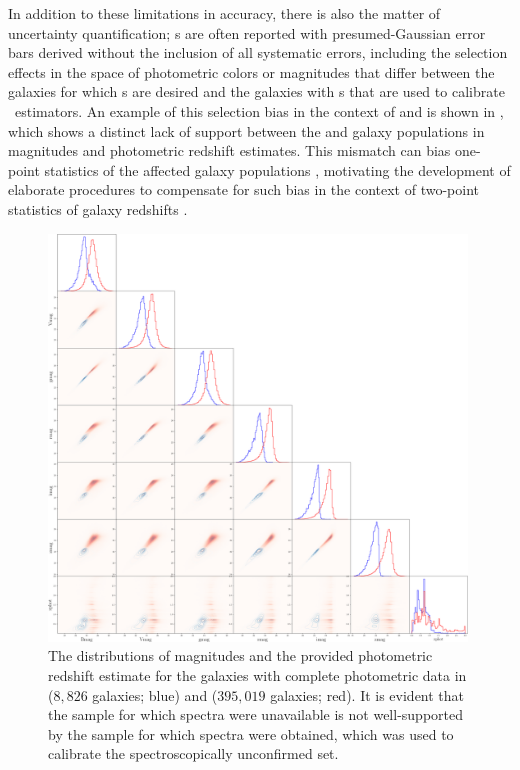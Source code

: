 In addition to these limitations in accuracy, there is also the matter of uncertainty quantification; \pz s are often reported with presumed-Gaussian error bars derived without the inclusion of all systematic errors, including the selection effects in the space of photometric colors or magnitudes that differ between the galaxies for which \pz s are desired and the galaxies with \sz s that are used to calibrate \pz\ estimators.
An example of this selection bias in the context of  \citep{lilly_zcosmos_2009} and  \citep{laigle_cosmos2015_2016} is shown in , which shows a distinct lack of support between the  and  galaxy populations in magnitudes and photometric redshift estimates.
This mismatch can bias one-point statistics of the affected galaxy populations \citep{moresco_spot_2013}, motivating the development of elaborate procedures to compensate for such bias in the context of two-point statistics of galaxy redshifts \citep{mandelbaum_precision_2008}.

\begin{figure}
	\begin{center}
		\includegraphics[width=0.99\textwidth]{figures/intro/big_corner_coarse.png}
		\caption{
			The distributions of magnitudes and the provided photometric redshift estimate for the galaxies with complete photometric data in  ($8,826$ galaxies; blue) and  ($395,019$ galaxies; red).
			It is evident that the sample for which spectra were unavailable is not well-supported by the sample for which spectra were obtained, which was used to calibrate the spectroscopically unconfirmed set.
		}
	\end{center}
\end{figure}

